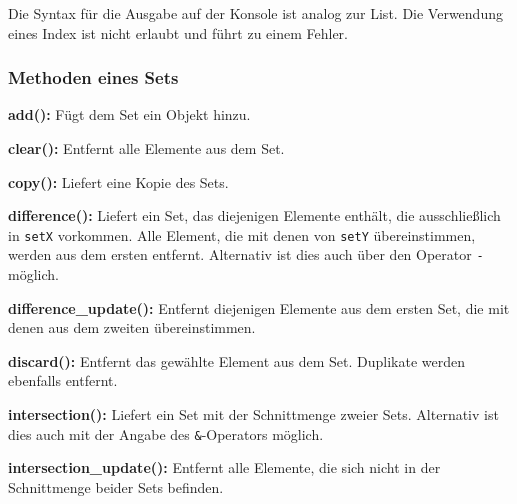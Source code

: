 Die Syntax für die Ausgabe auf der Konsole ist analog zur List. Die Verwendung eines Index ist nicht erlaubt und führt zu einem Fehler.

\label{collections:lst:setprint} 
 
\subsubsection{Methoden eines Sets}
\label{collections:setmethodes} 

\textbf{add():}
Fügt dem Set ein Objekt hinzu.
   
\label{collections:lst:setadd}  

\textbf{clear():}
Entfernt alle Elemente aus dem Set.

\label{collections:lst:setclear}     

\textbf{copy():}
Liefert eine Kopie des Sets.

\label{collections:lst:setcopy}     

\textbf{difference():}
Liefert ein Set, das diejenigen Elemente enthält, die ausschließlich in \lstinline$setX$ vorkommen. Alle Element, die mit denen von \lstinline$setY$ übereinstimmen, werden aus dem ersten entfernt. Alternativ ist dies auch über den Operator \lstinline$-$ möglich.

\label{collections:lst:setdifference} 
    
\textbf{difference\_update():}
Entfernt diejenigen Elemente aus dem ersten Set, die mit denen aus dem zweiten übereinstimmen.

\label{collections:lst:setdifferenceupdate}  
 
\textbf{discard():}
Entfernt das gewählte Element aus dem Set. Duplikate werden ebenfalls entfernt.

\label{collections:lst:setdiscard} 

\textbf{intersection():}
Liefert ein Set mit der Schnittmenge zweier Sets. Alternativ ist dies auch mit der Angabe des \lstinline$&$-Operators möglich.

\label{collections:lst:setintersection} 

\textbf{intersection\_update():}
Entfernt alle Elemente, die sich nicht in der Schnittmenge beider Sets befinden.

\label{collections:lst:setintersectionupdate} 
    
